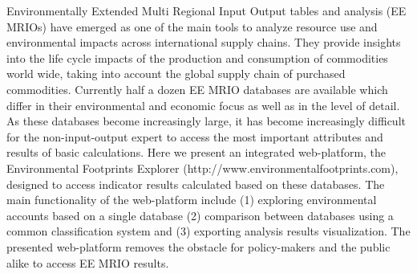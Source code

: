 Environmentally Extended Multi Regional Input Output tables and analysis (EE MRIOs) have emerged as one of the main tools to analyze resource use and environmental impacts across international supply chains. They provide insights into the life cycle impacts of the production and consumption of commodities world wide, taking into account the global supply chain of purchased commodities. Currently half a dozen EE MRIO databases are available which differ in their environmental and economic focus as well as in the level of detail. As these databases become increasingly large, it has become increasingly difficult for the non-input-output expert to access the most important attributes and results of basic calculations. Here we present an integrated web-platform, the Environmental Footprints Explorer (http://www.environmentalfootprints.com), designed to access indicator results calculated based on these databases. The main functionality of the web-platform include (1) exploring environmental accounts based on a single database (2) comparison between databases using a common classification system and (3) exporting analysis results visualization. The presented web-platform removes the obstacle for policy-makers and the public alike to access EE MRIO results. 


    
    